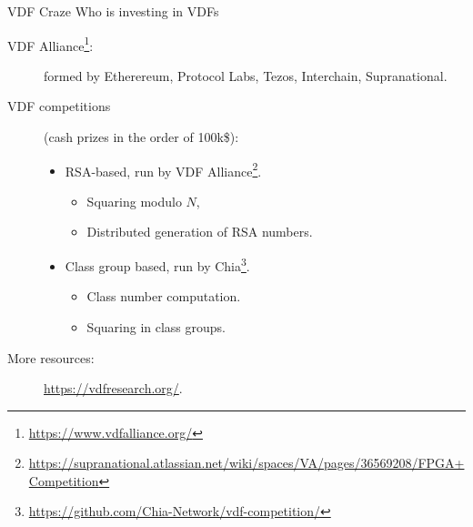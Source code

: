 \documentclass[aspectratio=169]{beamer}
\begin{document}
\begin{frame}{VDF Craze}
  Who is investing in VDFs

  \begin{description}
  \item[VDF Alliance\footnote{\url{https://www.vdfalliance.org/}}:]
    formed by Etherereum, Protocol Labs, Tezos, Interchain,
    Supranational.
  \item[VDF competitions] (cash prizes in the order of 100k\$):
    \begin{itemize}
    \item RSA-based, run by VDF
      Alliance\footnote{\url{https://supranational.atlassian.net/wiki/spaces/VA/pages/36569208/FPGA+Competition}}.
      \begin{itemize}
      \item Squaring modulo $N$,
      \item Distributed generation of RSA numbers.
      \end{itemize}
    \item Class group based, run by
      Chia\footnote{\url{https://github.com/Chia-Network/vdf-competition/}}.
      \begin{itemize}
      \item Class number computation.
      \item Squaring in class groups.
      \end{itemize}
    \end{itemize}
  \item[More resources:] \url{https://vdfresearch.org/}.
  \end{description}
\end{frame}

\end{document}
